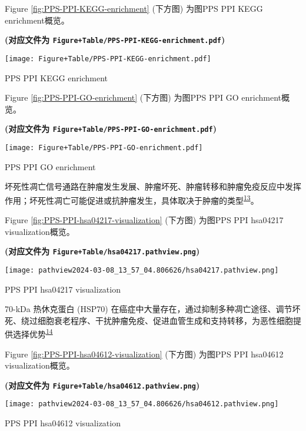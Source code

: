 \documentclass[
]{article}
\begin{document}
Figure \ref{fig:PPS-PPI-KEGG-enrichment} (下方图) 为图PPS PPI KEGG enrichment概览。

\textbf{(对应文件为 \texttt{Figure+Table/PPS-PPI-KEGG-enrichment.pdf})}

\def\@captype{figure}
\begin{center}
\texttt{[image: Figure+Table/PPS-PPI-KEGG-enrichment.pdf]}
\caption{PPS PPI KEGG enrichment}\label{fig:PPS-PPI-KEGG-enrichment}
\end{center}

Figure \ref{fig:PPS-PPI-GO-enrichment} (下方图) 为图PPS PPI GO enrichment概览。

\textbf{(对应文件为 \texttt{Figure+Table/PPS-PPI-GO-enrichment.pdf})}

\def\@captype{figure}
\begin{center}
\texttt{[image: Figure+Table/PPS-PPI-GO-enrichment.pdf]}
\caption{PPS PPI GO enrichment}\label{fig:PPS-PPI-GO-enrichment}
\end{center}

坏死性凋亡信号通路在肿瘤发生发展、肿瘤坏死、肿瘤转移和肿瘤免疫反应中发挥作用；坏死性凋亡可能促进或抗肿瘤发生，具体取决于肿瘤的类型\textsuperscript{\protect\hyperlink{ref-NecroptosisAndYanJ2022}{13}}。

Figure \ref{fig:PPS-PPI-hsa04217-visualization} (下方图) 为图PPS PPI hsa04217 visualization概览。

\textbf{(对应文件为 \texttt{Figure+Table/hsa04217.pathview.png})}

\def\@captype{figure}
\begin{center}
\texttt{[image: pathview2024-03-08\_13\_57\_04.806626/hsa04217.pathview.png]}
\caption{PPS PPI hsa04217 visualization}\label{fig:PPS-PPI-hsa04217-visualization}
\end{center}

70-kDa 热休克蛋白 (HSP70) 在癌症中大量存在，通过抑制多种凋亡途径、调节坏死、绕过细胞衰老程序、干扰肿瘤免疫、促进血管生成和支持转移，为恶性细胞提供选择优势\textsuperscript{\protect\hyperlink{ref-Hsp70MultiFunAlbako2020}{14}}

Figure \ref{fig:PPS-PPI-hsa04612-visualization} (下方图) 为图PPS PPI hsa04612 visualization概览。

\textbf{(对应文件为 \texttt{Figure+Table/hsa04612.pathview.png})}

\def\@captype{figure}
\begin{center}
\texttt{[image: pathview2024-03-08\_13\_57\_04.806626/hsa04612.pathview.png]}
\caption{PPS PPI hsa04612 visualization}\label{fig:PPS-PPI-hsa04612-visualization}
\end{center}
\end{document}
